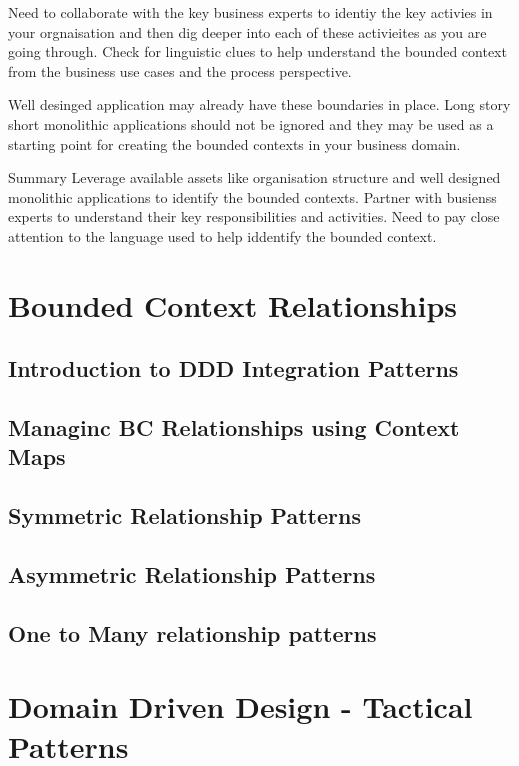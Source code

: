 \documentclass[a4paper, 11pt]{book}
\begin{document}
{    Need to collaborate with the key business experts to identiy the key activies in your orgnaisation and then dig deeper into each of these activieites as you are going through.
    Check for linguistic clues to help understand the bounded context from the business use cases and the process perspective.

    Well desinged application may already have these boundaries in place.
    Long story short monolithic applications should not be ignored and they may be used as a starting point for creating the bounded contexts in your business domain.

    Summary
    Leverage available assets like organisation structure and well designed monolithic applications to identify the bounded contexts.
    Partner with busienss experts to understand their key responsibilities and activities.
    Need to pay close attention to the language used to help iddentify the bounded context.




    \chapter{Bounded Context Relationships}


    \section{Introduction to DDD Integration Patterns}


    \section{Managinc BC Relationships using Context Maps}


    \section{Symmetric Relationship Patterns}


    \section{Asymmetric Relationship Patterns}


    \section{One to Many relationship patterns}


    \chapter{Domain Driven Design - Tactical Patterns}


}
\end{document}
